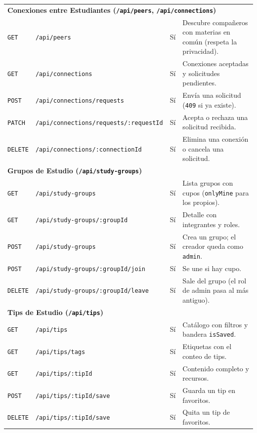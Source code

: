 \documentclass[11pt,letterpaper]{article}
\begin{document}
{\begin{longtable}{l >{\raggedright\arraybackslash}p{5.6cm} c >{\raggedright\arraybackslash}p{5.4cm}}
  \multicolumn{4}{l}{\textbf{\textcolor{carmesiOscuroA}{Conexiones entre Estudiantes (\texttt{/api/peers}, \texttt{/api/connections})}}} \\
  \texttt{GET} & \texttt{/api/peers} & Sí & Descubre compañeros con materias en común (respeta la privacidad). \\
  \texttt{GET} & \texttt{/api/connections} & Sí & Conexiones aceptadas y solicitudes pendientes. \\
  \texttt{POST} & \texttt{/api/connections/requests} & Sí & Envía una solicitud (\texttt{409} si ya existe). \\
  \texttt{PATCH} & \texttt{/api/connections/requests/:requestId} & Sí & Acepta o rechaza una solicitud recibida. \\
  \texttt{DELETE} & \texttt{/api/connections/:connectionId} & Sí & Elimina una conexión o cancela una solicitud. \\
  \midrule

  \multicolumn{4}{l}{\textbf{\textcolor{carmesiOscuroA}{Grupos de Estudio (\texttt{/api/study-groups})}}} \\
  \texttt{GET} & \texttt{/api/study-groups} & Sí & Lista grupos con cupos (\texttt{onlyMine} para los propios). \\
  \texttt{GET} & \texttt{/api/study-groups/:groupId} & Sí & Detalle con integrantes y roles. \\
  \texttt{POST} & \texttt{/api/study-groups} & Sí & Crea un grupo; el creador queda como \texttt{admin}. \\
  \texttt{POST} & \texttt{/api/study-groups/:groupId/join} & Sí & Se une si hay cupo. \\
  \texttt{DELETE} & \texttt{/api/study-groups/:groupId/leave} & Sí & Sale del grupo (el rol de admin pasa al más antiguo). \\
  \midrule

  \multicolumn{4}{l}{\textbf{\textcolor{carmesiOscuroA}{Tips de Estudio (\texttt{/api/tips})}}} \\
  \texttt{GET} & \texttt{/api/tips} & Sí & Catálogo con filtros y bandera \texttt{isSaved}. \\
  \texttt{GET} & \texttt{/api/tips/tags} & Sí & Etiquetas con el conteo de tips. \\
  \texttt{GET} & \texttt{/api/tips/:tipId} & Sí & Contenido completo y recursos. \\
  \texttt{POST} & \texttt{/api/tips/:tipId/save} & Sí & Guarda un tip en favoritos. \\
  \texttt{DELETE} & \texttt{/api/tips/:tipId/save} & Sí & Quita un tip de favoritos. \\
  \midrule


\end{longtable}}
\end{document}
